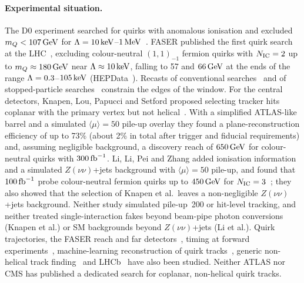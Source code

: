 \paragraph{Experimental situation.} The D0 experiment searched for quirks with anomalous ionisation and excluded
$m_Q<107\,\mathrm{GeV}$ for $\Lambda=10\,\mathrm{keV}$--$1\,\mathrm{MeV}$~\cite{D0:2010kkd}. FASER published the first quirk search at the
LHC~\cite{FASER:2026fsy}, excluding colour-neutral $(1,1)_{-1}$ fermion quirks with $N_{\rm IC}=2$ up to
$m_Q\approx180\,\mathrm{GeV}$ near $\Lambda\approx10\,\mathrm{keV}$, falling to 57 and $66\,\mathrm{GeV}$ at the ends of the range
$\Lambda=0.3$--$105\,\mathrm{keV}$ (HEPData~\cite{FASER:HEPData181308v1t2}). Recasts of
conventional searches~\cite{Farina:2017cts} and of stopped-particle searches~\cite{Evans:2018jmd,CMS:2017kku} constrain
the edges of the window. For the central detectors, Knapen, Lou, Papucci and Setford proposed selecting tracker hits
coplanar with the primary vertex but not helical~\cite{Knapen:2017kly}. With a simplified ATLAS-like barrel and a simulated
$\langle\mu\rangle=50$ pile-up overlay they found a plane-reconstruction efficiency of up to 73\% (about 2\% in total after
trigger and fiducial requirements) and, assuming negligible background, a discovery reach of $650\,\mathrm{GeV}$ for colour-neutral
quirks with $300\,\mathrm{fb}^{-1}$. Li, Li, Pei and Zhang added ionisation information and a simulated $Z(\nu\nu)$+jets background
with $\langle\mu\rangle=50$ pile-up, and found that $100\,\mathrm{fb}^{-1}$ probe colour-neutral fermion quirks up to $450\,\mathrm{GeV}$ for
$N_{\rm IC}=3$~\cite{Li:2019wce}; they also showed that the selection of Knapen et al.\ leaves a non-negligible $Z(\nu\nu)$+jets
background. Neither study simulated pile-up~200 or hit-level tracking, and neither treated single-interaction fakes beyond
beam-pipe photon conversions (Knapen et al.) or SM backgrounds beyond $Z(\nu\nu)$+jets (Li et al.). Quirk
trajectories, the FASER reach and far detectors~\cite{Li:2020aoq,Li:2021tsy,Li:2023jrt}, timing at forward
experiments~\cite{Feng:2024zgp}, machine-learning reconstruction of quirk tracks~\cite{Sha:2024hzq}, generic non-helical
track finding~\cite{Condren:2025czc} and LHCb~\cite{CidVidal:2020okg} have also been studied. Neither ATLAS nor CMS has
published a dedicated search for coplanar, non-helical quirk tracks.

